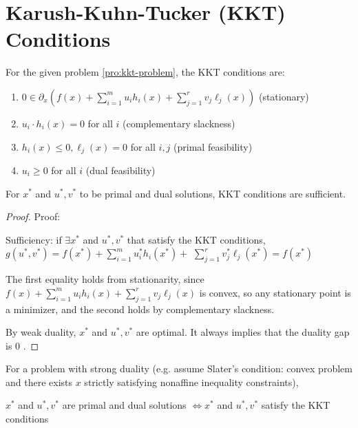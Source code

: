 \section{Karush-Kuhn-Tucker (KKT) Conditions}

For the given problem \ref{pro:kkt-problem}, the KKT conditions are:

\begin{enumerate}
    \item $ 0 \in \partial_{x}\left(f(x)+\sum_{i=1}^{m} u_{i} h_{i}(x)+\sum_{j=1}^{r} v_{j} \ell_{j}(x)\right) $ (stationary)
    \item $ u_{i} \cdot h_{i}(x)=0 $ for all $ i $ (complementary slackness)
    \item $ h_{i}(x) \leq 0, \ell_{j}(x)=0 $ for all $ i, j $ (primal feasibility)
    \item $ u_{i} \geq 0 $ for all $ i $ (dual feasibility)
\end{enumerate}

\begin{theorem}
    \label{thm:kkt-sufficient}
    For $ x^{*} $ and $ u^{*}, v^{*} $ to be primal and dual solutions, KKT conditions are sufficient.
\end{theorem}

\begin{proof}
    Proof: 
    
    Sufficiency: if $ \exists x^{*} $ and $ u^{*}, v^{*} $ that satisfy the KKT conditions, $ g\left(u^{*}, v^{*}\right)=f\left(x^{*}\right)+\sum_{i=1}^{m} u_{i}^{*} h_{i}\left(x^{*}\right)+ $ $ \sum_{j=1}^{r} v_{j}^{*} \ell_{j}\left(x^{*}\right)=f\left(x^{*}\right) $ 
    
    The first equality holds from stationarity, since $ f(x)+\sum_{i=1}^{m} u_{i} h_{i}(x)+\sum_{j=1}^{r} v_{j} \ell_{j}(x) $ is convex, so any stationary point is a minimizer, and the second holds by complementary slackness. 
    
    By weak duality, $ x^{*} $ and $ u^{*}, v^{*} $ are optimal. It always implies that the duality gap is 0 .
\end{proof}

\begin{theorem}
    For a problem with strong duality (e.g. assume Slater's condition: convex problem and there exists $ x $ strictly satisfying nonaffine inequality constraints),

    $ x^{*} $ and $ u^{*}, v^{*} $ are primal and dual solutions $ \Longleftrightarrow x^{*} $ and $ u^{*}, v^{*} $ satisfy the KKT conditions
\end{theorem}


